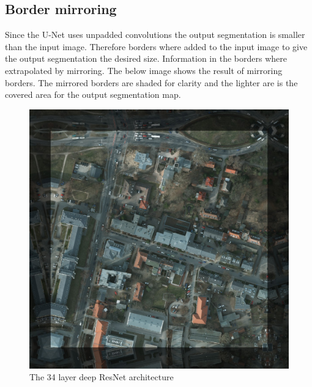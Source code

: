 \documentclass{kththesis}
\begin{document}
\subsection{Border mirroring}
Since the U-Net uses unpadded convolutions the output segmentation is smaller than the input image. Therefore borders where added to the input image to give the output segmentation the desired size. Information in the borders where extrapolated by mirroring. The below image shows the result of mirroring borders. The mirrored borders are shaded for clarity and the lighter are is the covered area for the output segmentation map.
\begin{figure}[H]
  \centering
      \includegraphics[scale=.8]{borders}
  \caption{The 34 layer deep ResNet architecture \parencite{simonyan_very_2014}} \label{fig:vgg}
\end{figure}
\end{document}
